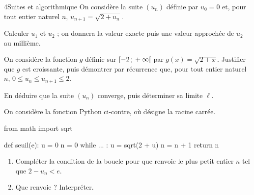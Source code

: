 \begin{exoBac}{4}{Suites et algorithmique}
On considère la suite $(u_n)$ définie par $u_0=0$ et, pour tout entier naturel $n$, $u_{n+1}=\sqrt{2+u_n}$.
\begin{questions}
  \item Calculer $u_1$ et $u_2$ ; on donnera la valeur exacte puis une valeur approchée de $u_2$ au millième.
  \item On considère la fonction $g$ définie sur $\mathopen{[}-2\,{;}\,+\infty\mathclose{[}$ par $g(x)=\sqrt{2+x}$. Justifier que $g$ est croissante, puis
    démontrer par récurrence que, pour tout entier naturel $n$, $0\leq u_n\leq u_{n+1}\leq2$.
  \item En déduire que la suite $(u_n)$ converge, puis déterminer sa limite $\ell$.
  \item On considère la fonction Python ci-contre, où  désigne la racine carrée.
\begin{codecote}[0.46]
\begin{pythoncol}
from math import sqrt

def seuil(e):
    u = 0
    n = 0
    while ... :
        u = sqrt(2 + u)
        n = n + 1
    return n
\end{pythoncol}
\cote
\begin{enumerate}[label=\alph*),leftmargin=1.4em,itemsep=0.6mm,topsep=0mm]
  \item Compléter la condition de la boucle pour que  renvoie le plus petit entier $n$ tel que $2-u_n<e$.
  \item Que renvoie  ? Interpréter.
\end{enumerate}
\end{codecote}
\end{questions}
\end{exoBac}
